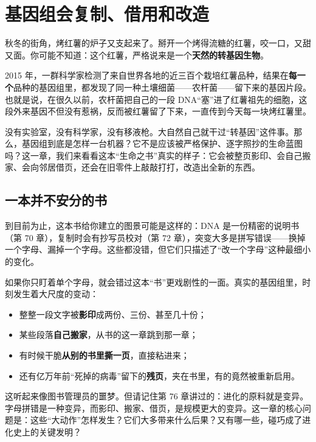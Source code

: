 \chapter{基因组会复制、借用和改造}

\begin{kaichang}
秋冬的街角，烤红薯的炉子又支起来了。掰开一个烤得流糖的红薯，咬一口，又甜又面。你可能不知道：这个红薯，严格说来是一个\textbf{天然的转基因生物}。

2015 年，一群科学家检测了来自世界各地的近三百个栽培红薯品种，结果在\textbf{每一个}品种的基因组里，都发现了同一种土壤细菌——农杆菌——留下来的基因片段。也就是说，在很久以前，农杆菌把自己的一段 DNA“塞”进了红薯祖先的细胞，这段外来基因不但没有惹祸，反而被红薯留了下来，一直传到今天每一块烤红薯里。

没有实验室，没有科学家，没有移液枪。大自然自己就干过“转基因”这件事。那么，基因组到底是怎样一台机器？它不是应该被严格保护、逐字照抄的生命蓝图吗？这一章，我们来看看这本“生命之书”真实的样子：它会被整页影印、会自己搬家、会向邻居借页，还会在旧零件上敲敲打打，改造出全新的东西。
\end{kaichang}

\section{一本并不安分的书}

到目前为止，这本书给你建立的图景可能是这样的：DNA 是一份精密的说明书（第 70 章），复制时会有抄写员校对（第 72 章），突变大多是拼写错误——换掉一个字母、漏掉一个字母。这些都没错，但它们只描述了“改一个字母”这种最细小的变化。

如果你只盯着单个字母，就会错过这本“书”更戏剧性的一面。真实的基因组里，时刻发生着大尺度的变动：

\begin{itemize}[itemsep=2pt]
\item 整整一段文字被\textbf{影印}成两份、三份、甚至几十份；
\item 某些段落\textbf{自己搬家}，从书的这一章跳到那一章；
\item 有时候干脆\textbf{从别的书里撕一页}，直接粘进来；
\item 还有亿万年前“死掉的病毒”留下的\textbf{残页}，夹在书里，有的竟然被重新启用。
\end{itemize}

这听起来像图书管理员的噩梦。但请记住第 76 章讲过的：进化的原料就是变异。字母拼错是一种变异，而影印、搬家、借页，是规模更大的变异。这一章的核心问题是：这些“大动作”怎样发生？它们大多带来什么后果？又有哪一些，碰巧成了进化史上的关键发明？

